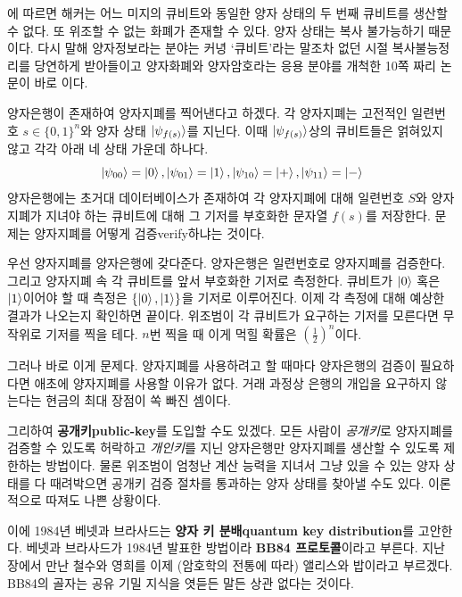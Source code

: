 \documentclass[a4paper,chapter,atbegshi]{oblivoir}
\begin{document}
에 따르면 해커는 어느 미지의 큐비트와 동일한 양자 상태의
두 번째 큐비트를 생산할 수 없다. 또 위조할 수 없는 화폐가 존재할 수 있다.
양자 상태는 복사 불가능하기 때문이다. 다시 말해 양자정보라는 
분야는 커녕 `큐비트'라는 말조차 없던 시절 복사불능정리를 당연하게
받아들이고 양자화폐와 양자암호라는 응용 분야를 개척한 10쪽 짜리 논문이
바로 이다.

양자은행이 존재하여 양자지폐를 찍어낸다고 하겠다. 각 양자지폐는 고전적인 
일련번호 $s\in\{0,1\}^n$와 양자 상태 $\ket{\psi_{f(s)}}$를 지닌다. 이때
$\ket{\psi_{f(s)}}$상의 큐비트들은 얽혀있지 않고 각각 아래 네 상태 가운데
하나다.
\[
  \ket{\psi_{00}}=\ket0,\ket{\psi_{01}}=\ket1,\ket{\psi_{10}}=\ket+,
  \ket{\psi_{11}}=\ket-
\]
양자은행에는 초거대 데이터베이스가 존재하여 각 양자지폐에 대해 일련번호 $S$와
양자지폐가 지녀야 하는 큐비트에 대해 그 기저를 부호화한 문자열 $f(s)$를 저장한다.
문제는 양자지폐를 어떻게 검증{\tiny verify}하냐는 것이다.

우선 양자지폐를 양자은행에 갖다준다. 양자은행은 일련번호로 양자지폐를 검증한다.
그리고 양자지폐 속 각 큐비트를 앞서 부호화한 기저로 측정한다. 큐비트가 $\ket0$
혹은 $\ket1$이어야 할 때 측정은 $\{\ket0,\ket1\}$을 기저로 이루어진다. 이제 각
측정에 대해 예상한 결과가 나오는지 확인하면 끝이다. 위조범이 각 큐비트가 요구하는
기저를 모른다면 무작위로 기저를 찍을 테다. $n$번 찍을 때 이게 먹힐 확률은
$\left(\frac{1}{2}\right)^n$이다.

그러나 바로 이게 문제다. 양자지폐를 사용하려고 할 때마다 양자은행의 검증이
필요하다면 애초에 양자지폐를 사용할 이유가 없다. 거래 과정상 은행의 개입을
요구하지 않는다는 현금의 최대 장점이 쏙 빠진 셈이다. 

그리하여 \textbf{공개키\tiny public-key}를 도입할 수도 있겠다. 모든 사람이
\emph{공개키}로 양자지폐를 검증할 수 있도록 허락하고 \emph{개인키}를 지닌
양자은행만 양자지폐를 생산할 수 있도록 제한하는 방법이다. 물론 위조범이
엄청난 계산 능력을 지녀서 그냥 있을 수 있는 양자 상태를 다 때려박으면
공개키 검증 절차를 통과하는 양자 상태를 찾아낼 수도 있다. 이론적으로
따져도 나쁜 상황이다.

이에 1984년 베넷과 브라사드는 \textbf{양자 키 분배\tiny quantum key
distribution}를 고안한다. 베넷과 브라사드가 1984년 발표한 방법이라
\textbf{BB84 프로토콜}이라고 부른다. 지난 장에서 만난 철수와 영희를 
이제 (암호학의 전통에 따라) 앨리스와 밥이라고 부르겠다.
BB84의 골자는 공유 기밀 지식을 엿듣든 말든 상관 없다는 것이다.
\end{document}
